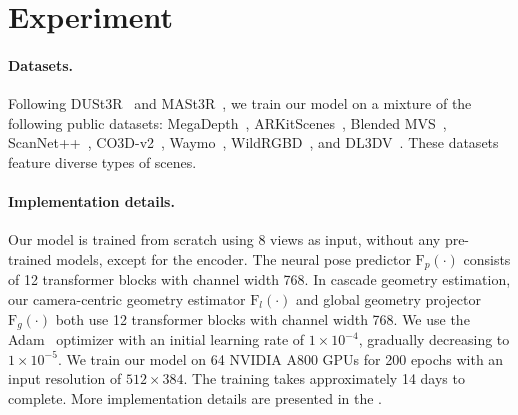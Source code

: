 \section{Experiment}\label{sec::exp}

\paragraph{Datasets.}
Following DUSt3R~\cite{wang2024dust3r} and MASt3R~\cite{leroy2024grounding}, we train our model on a mixture of the following public datasets: MegaDepth~\cite{li2018megadepth}, ARKitScenes~\cite{baruch2021arkitscenes}, Blended MVS~\cite{yao2020blendedmvs}, ScanNet++~\cite{yeshwanth2023scannet++}, CO3D-v2~\cite{Reizenstein2021CommonOI}, Waymo~\cite{Sun_2020_CVPR}, WildRGBD~\cite{xia2024rgbd}, and DL3DV~\cite{Ling_2024_CVPR}. These datasets feature diverse types of scenes.




\paragraph{Implementation details.} 
Our model is trained from scratch using 8 views as input, without any pre-trained models, except for the encoder.
The neural pose predictor $\mathrm{F}_{p}(\cdot)$ consists of 12 transformer blocks with channel width 768.
%
In cascade geometry estimation, our camera-centric geometry estimator $\mathrm{F}_{l}(\cdot)$  and global geometry projector $\mathrm{F}_{g}(\cdot)$ both use 12 transformer blocks with channel width 768.
%
We use the Adam~\cite{kingma2014adam} optimizer with an initial learning rate of $1\times10^{-4}$, gradually decreasing to $1\times10^{-5}$. We train our model on 64 NVIDIA A800 GPUs for 200 epochs with an input resolution of $512\times384$. The training takes approximately 14 days to complete. 
% 
%
More implementation details are presented in the \supp.

